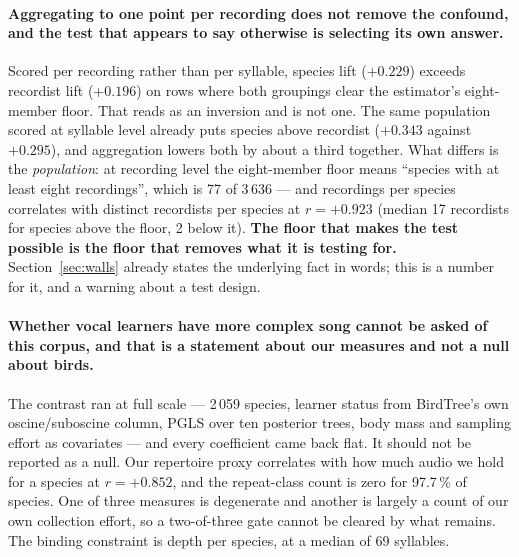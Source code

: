 \documentclass[10pt,twocolumn,a4paper]{article}
\begin{document}
\paragraph{Aggregating to one point per recording does not remove the confound, and the
test that appears to say otherwise is selecting its own answer.} Scored per recording rather
than per syllable, species lift ($+0.229$) exceeds recordist lift ($+0.196$) on rows where
both groupings clear the estimator's eight-member floor. That reads as an inversion and is
not one. The same population scored at syllable level already puts species above recordist
($+0.343$ against $+0.295$), and aggregation lowers both by about a third together. What
differs is the \emph{population}: at recording level the eight-member floor means ``species
with at least eight recordings'', which is 77 of 3\,636 --- and recordings per species
correlates with distinct recordists per species at $r = +0.923$ (median 17 recordists for
species above the floor, 2 below it). \textbf{The floor that makes the test possible is the
floor that removes what it is testing for.} Section~\ref{sec:walls} already states the
underlying fact in words; this is a number for it, and a warning about a test design.

\paragraph{Whether vocal learners have more complex song cannot be asked of this corpus,
and that is a statement about our measures and not a null about birds.} The contrast ran
at full scale --- 2\,059 species, learner status from BirdTree's own oscine/suboscine
column, PGLS over ten posterior trees, body mass and sampling effort as covariates --- and
every coefficient came back flat. It should not be reported as a null. Our repertoire proxy
correlates with how much audio we hold for a species at $r = +0.852$, and the repeat-class
count is zero for 97.7\,\% of species. One of three measures is degenerate and another is
largely a count of our own collection effort, so a two-of-three gate cannot be cleared by
what remains. The binding constraint is depth per species, at a median of 69 syllables.
\end{document}
